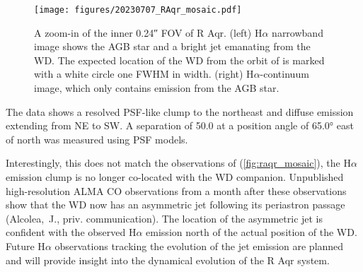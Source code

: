 \begin{figure}
    \centering
    \texttt{[image: figures/20230707\_RAqr\_mosaic.pdf]}
    \caption{A zoom-in of the inner \ang{;;0.24} FOV of R Aqr. (left) H$\alpha$ narrowband image shows the AGB star and a bright jet emanating from the WD. The expected location of the WD from the orbit of \citet{alcolea_determining_2023} is marked with a white circle one FWHM in width. (right) H$\alpha$-continuum image, which only contains emission from the AGB star.\label{fig:raqr_mosaic}}
\end{figure}

The data shows a resolved PSF-like clump to the northeast and diffuse emission extending from NE to SW. A separation of \SI{50.0}{\mas} at a position angle of \ang{65.0} east of north was measured using PSF models. 

Interestingly, this does not match the observations of \citet{bujarrabal_high-resolution_2018,alcolea_determining_2023} (\autoref{fig:raqr_mosaic}), the H$\alpha$ emission clump is no longer co-located with the WD companion. Unpublished high-resolution ALMA CO observations from a month after these observations show that the WD now has an asymmetric jet following its periastron passage (Alcolea,~J., priv. communication). The location of the asymmetric jet is confident with the observed H$\alpha$ emission north of the actual position of the WD. Future H$\alpha$ observations tracking the evolution of the jet emission are planned and will provide insight into the dynamical evolution of the R Aqr system.
